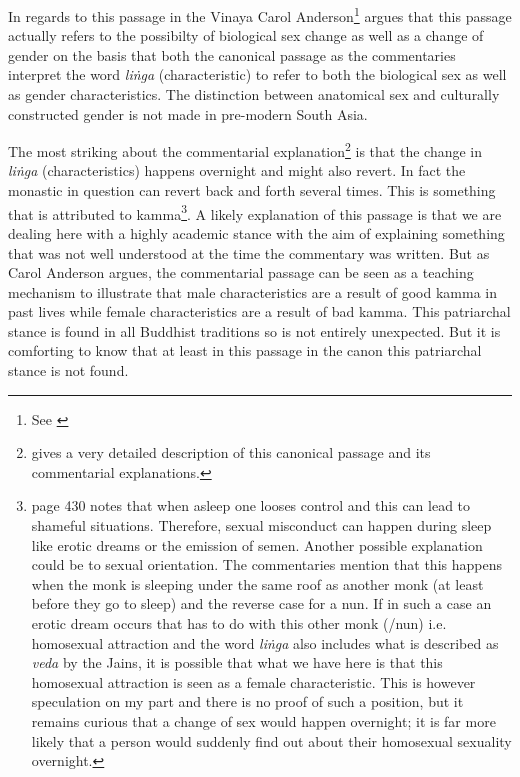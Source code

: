 In regards to this passage in the Vinaya Carol Anderson\footnote{See \cite{anderson2016a}} argues that this passage actually refers to the possibilty of biological sex change as well as a change of gender on the basis that both the canonical passage as the commentaries interpret the word {\em liṅga} (characteristic) to refer to both the biological sex as well as gender characteristics. The distinction between anatomical sex and culturally constructed gender is not made in pre-modern South Asia.

The most striking about the commentarial explanation\footnote{\cite{anderson2016} gives a very detailed description of this canonical passage and its commentarial explanations.} is that the change in {\em liṅga} (characteristics) happens overnight and might also revert. In fact the monastic in question can revert back and forth several times. This is something that is attributed to kamma\footnote{\cite{heirman} page 430 notes that when asleep one looses control and this can lead to shameful situations. Therefore, sexual misconduct can happen during sleep like erotic dreams or the emission of semen. Another possible explanation could be to sexual orientation. The commentaries mention that this happens when the monk is sleeping under the same roof as another monk (at least before they go to sleep) and the reverse case for a nun. If in such a case an erotic dream occurs that has to do with this other monk (/nun) i.e. homosexual attraction and the word {\em liṅga} also includes what is described as {\em veda} by the Jains, it is possible that what we have here is that this homosexual attraction is seen as a female characteristic. This is however speculation on my part and there is no proof of such a position, but it remains curious that a change of sex would happen overnight; it is far more likely that a person would suddenly find out about their homosexual sexuality overnight.}. A likely explanation of this passage is that we are dealing here with a highly academic stance with the aim of explaining something that was not well understood at the time the commentary was written. But as Carol Anderson argues, the commentarial passage can be seen as a teaching mechanism to illustrate that male characteristics are a result of good kamma in past lives while female characteristics are a result of bad kamma. This patriarchal stance is found in all Buddhist traditions so is not entirely unexpected. But it is comforting to know that at least in this passage in the canon this patriarchal stance is not found.


